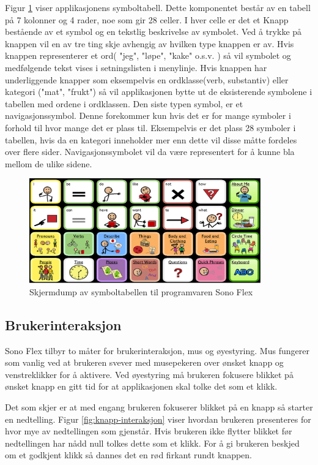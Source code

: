 \documentclass[phd,tocprelim]{cornell}
\begin{document}
Figur \ref{fig:symbolgrid} viser applikasjonens symboltabell. Dette komponentet består av en tabell på 7 kolonner og 4 rader,  noe som gir 28 celler. I hver celle er det et Knapp bestående av et symbol og en tekstlig beskrivelse av symbolet. Ved å trykke på knappen vil en av tre ting skje avhengig av hvilken type knappen er av. Hvis knappen representerer et ord( "jeg",  "løpe",  "kake" o.s.v. ) så vil symbolet og medfølgende tekst vises i setningslisten i menylinje.  Hvis knappen har underliggende knapper som eksempelvis en ordklasse(verb,  substantiv)  eller kategori ("mat",  "frukt") så vil applikasjonen bytte ut de eksisterende symbolene i tabellen med ordene i ordklassen. Den siste typen symbol, er et navigasjonssymbol. Denne forekommer kun hvis det er for mange symboler i forhold til hvor mange det er plass til. Eksempelvis er det plass 28 symboler i tabellen, hvis da en kategori inneholder mer enn dette vil disse måtte fordeles over flere sider. Navigasjonssymbolet vil da være representert for å kunne bla mellom de ulike sidene.


\begin{figure}[ht!]
\centering
\includegraphics[width=100mm]{symbolgrid}
\caption{Skjermdump av symboltabellen til programvaren Sono Flex}
\label{fig:symbolgrid}
\end{figure}


\subsection{Brukerinteraksjon}

Sono Flex tilbyr to måter for brukerinteraksjon,  mus og øyestyring. Mus fungerer som vanlig ved at brukeren svever med musepekeren over ønsket knapp og venstreklikker for å aktivere. Ved øyestyring må brukeren fokusere blikket på ønsket knapp en gitt tid for at applikasjonen skal tolke det som et klikk. 

Det som skjer er at med engang brukeren fokuserer blikket på en knapp så starter en nedtelling. Figur \ref{fig:knapp-interaksjon} viser hvordan brukeren presenteres for hvor mye av nedtellingen som gjenstår.  Hvis brukeren ikke flytter blikket før nedtellingen har nådd null tolkes dette som et klikk.
For å gi brukeren beskjed om et godkjent klikk så dannes det en rød firkant rundt knappen. 
\end{document}
